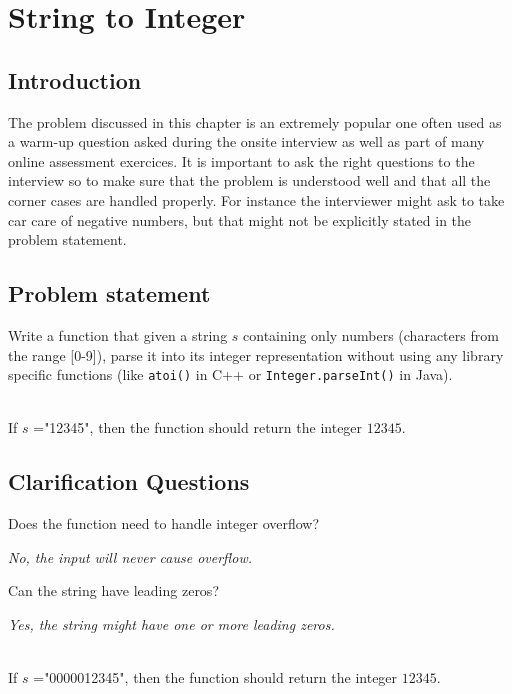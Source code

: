 %

\chapter{String to Integer}
\label{ch:string_to_int}
\section*{Introduction}
The problem discussed in this chapter is an extremely popular one often used as a warm-up question asked during the onsite interview as well as part of many online assessment exercices. It is important to ask the right questions to the interview so to make sure that the problem is understood well and that all the corner cases are handled properly. For instance the interviewer might ask  to take car care of negative numbers, but that might not be explicitly stated in the problem statement.

\section{Problem statement}
\begin{exercise}
Write a function that given a string $s$ containing only numbers (characters from the range [0-9]), parse it into its integer representation without using any library specific functions (like \texttt{atoi()} in C++ or  \texttt{Integer.parseInt()} in Java).
\end{exercise}


\begin{example}
	\hfill \\
	If $s$ ="12345", then the function should return the integer $12345$.	
\end{example}


\section{Clarification Questions}

\begin{QandA}
	\item Does the function need to handle integer overflow?
	\begin{answered}
		\textit{No, the input will never cause overflow.}
	\end{answered}

	\item Can the string have leading zeros?
	\begin{answered}
		\textit{Yes, the string might have one or more leading zeros.}
		\begin{example}
			\hfill \\
			If $s$ ="0000012345", then the function should return the integer $12345$.	
		\end{example}
	\end{answered}
	
\end{QandA}

